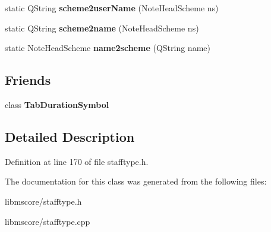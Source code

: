 \begin{DoxyCompactItemize}
\item 
\mbox{\label{class_ms_1_1_staff_type_adae22bc2f78a3fd00d5ed0cf5d3486a5}} 
static Q\+String {\bfseries scheme2user\+Name} (Note\+Head\+Scheme ns)
\item 
\mbox{\label{class_ms_1_1_staff_type_a0f5e12d55d7555a38f70eea1aec5a66a}} 
static Q\+String {\bfseries scheme2name} (Note\+Head\+Scheme ns)
\item 
\mbox{\label{class_ms_1_1_staff_type_aeb034e6a5294ae28d075862c319777ed}} 
static Note\+Head\+Scheme {\bfseries name2scheme} (Q\+String name)
\end{DoxyCompactItemize}
\subsection*{Friends}
\begin{DoxyCompactItemize}
\item 
\mbox{\label{class_ms_1_1_staff_type_a4215a50824ae165c2aaf4e2a8a825393}} 
class {\bfseries Tab\+Duration\+Symbol}
\end{DoxyCompactItemize}


\subsection{Detailed Description}


Definition at line 170 of file stafftype.\+h.



The documentation for this class was generated from the following files\+:\begin{DoxyCompactItemize}
\item 
libmscore/stafftype.\+h\item 
libmscore/stafftype.\+cpp\end{DoxyCompactItemize}
